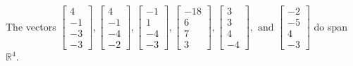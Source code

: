 \begin{exercise}
\begin{exerciseStatement}
  \end{exerciseStatement}
  \begin{exerciseAnswer}
   The vectors \(\left[\begin{array}{r}
4 \\
-1 \\
-3 \\
-3
\end{array}\right] , \left[\begin{array}{r}
4 \\
-1 \\
-4 \\
-2
\end{array}\right] , \left[\begin{array}{r}
-1 \\
1 \\
-4 \\
-3
\end{array}\right] , \left[\begin{array}{r}
-18 \\
6 \\
7 \\
3
\end{array}\right] , \left[\begin{array}{r}
3 \\
3 \\
4 \\
-4
\end{array}\right] , \text{ and } \left[\begin{array}{r}
-2 \\
-5 \\
4 \\
-3
\end{array}\right]\) 
  	 do  
	span \(\mathbb{R}^4\).
  


  \end{exerciseAnswer}
\end{exercise}